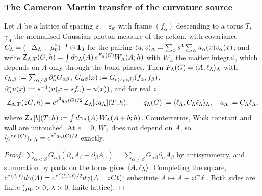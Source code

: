 
\subsubsection*{The Cameron--Martin transfer of the curvature source}

\begin{lemma}\label{rot:lem:CM}
Let $\Lambda$ be a lattice of spacing $s=\varepsilon_k$ with frame $(f_\alpha)$ descending to a torus $T$, $\gamma_\Lambda$ the normalised Gaussian photon measure of the action, with covariance $C_\Lambda=(-\Delta_\Lambda+\mu_0^2)^{-1}\otimes\mathbf 1_3$ for the pairing $\langle u,v\rangle_\Lambda=\sum_xs^3\sum_\alpha u_\alpha(x)v_\alpha(x)$, and write $\mathsf Z_{\Lambda,T}(G,h)=\int d\gamma_\Lambda(A)\,e^{F_\Lambda(G)}W_\Lambda(A;h)$ with $W_\Lambda$ the matter integral, which depends on $A$ only through the bond phases. Then $F_\Lambda(G)=\langle A,\ell_\Lambda\rangle_\Lambda$ with $\ell_{\Lambda,\beta}:=\sum_{\alpha\ne\beta}\partial^*_\alpha G_{\alpha\beta}$, $G_{\alpha\beta}(x):= G_{c(x;\alpha\beta)}(f_\alpha,f_\beta)$, $\partial^*_\alpha u(x):= s^{-1}(u(x-sf_\alpha)-u(x))$, and for real $z$
\[
\mathsf Z_{\Lambda,T}(zG,h)=e^{z^2q_\Lambda(G)/2}\,\mathsf Z_\Lambda[za_\Lambda](T;h),\qquad q_\Lambda(G):=\langle \ell_\Lambda,C_\Lambda\ell_\Lambda\rangle_\Lambda,\quad a_\Lambda:= C_\Lambda\ell_\Lambda,
\]
where $\mathsf Z_\Lambda[b](T;h):=\int d\gamma_\Lambda(A)\,W_\Lambda(A+b;h)$. Counterterms, Wick constant and wall are untouched. At $e=0$, $W_\Lambda$ does not depend on $A$, so $\langle e^{zF(G)}\rangle_{\mathfrak c,\Lambda}=e^{z^2q_\Lambda(G)/2}$ exactly.
\end{lemma}
\begin{proof}
$\sum_{\alpha<\beta}G_{\alpha\beta}(\partial_\alpha A_\beta-\partial_\beta A_\alpha)=\sum_{\alpha\ne\beta}G_{\alpha\beta}\partial_\alpha A_\beta$ by antisymmetry, and summation by parts on the torus gives $\langle A,\ell_\Lambda\rangle$. Completing the square, $e^{z\langle A,\ell\rangle}d\gamma(A)=e^{z^2\langle \ell,C\ell\rangle/2}d\gamma(A-zC\ell)$; substitute $A\mapsto A+zC\ell$. Both sides are finite ($\mu_0>0$, $\lambda>0$, finite lattice).
\end{proof}

